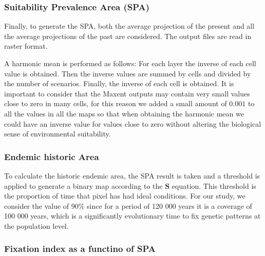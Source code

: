 \documentclass[
]{article}
\begin{document}
\hypertarget{suitability-prevalence-area-spa}{%
\subsubsection{Suitability Prevalence Area
(SPA)}\label{suitability-prevalence-area-spa}}

Finally, to generate the SPA, both the average projection of the present
and all the average projections of the past are considered. The output
files are read in raster format.

A harmonic mean is performed as follows: For each layer the inverse of
each cell value is obtained. Then the inverse values are summed by cells
and divided by the number of scenarios. Finally, the inverse of each
cell is obtained. It is important to consider that the Maxent outputs
may contain very small values close to zero in many cells, for this
reason we added a small amount of \(0.001\) to all the values in all the
maps so that when obtaining the harmonic mean we could have an inverse
value for values close to zero without altering the biological sense of
environmental suitability.

\hypertarget{endemic-historic-area}{%
\subsubsection{Endemic historic Area}\label{endemic-historic-area}}

To calculate the historic endemic area, the SPA result is taken and a
threshold is applied to generate a binary map according to the
\(\mathbf{S}\) equation. This threshold is the proportion of time that
pixel has had ideal conditions. For our study, we consider the value of
90\% since for a period of 120 000 years it is a coverage of 100 000
years, which is a significantly evolutionary time to fix genetic
patterns at the population level.

\hypertarget{fixation-index-as-a-functino-of-spa}{%
\subsubsection{Fixation index as a functino of
SPA}\label{fixation-index-as-a-functino-of-spa}}
\end{document}
